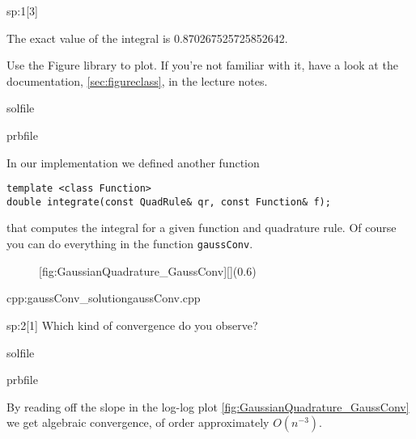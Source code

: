 \begin{samproblem}
\begin{subproblem}{sp:1}[3]
  \begin{samhint}
    The exact value of the integral is 0.870267525725852642.
  \end{samhint}

  \begin{samhint}
    Use the Figure library to plot. If you're not familiar with it,  have a look at the documentation, \cref{sec:figureclass}, in the lecture notes.
  \end{samhint}

  \begin{samwriteprbpart}{solfile}
    \begin{writeverbatim}{prbfile}
      \begin{samsolution}
        In our implementation we defined another function 
        \begin{lstlisting}[style=cpp]
template <class Function>
double integrate(const QuadRule& qr, const Function& f);
        \end{lstlisting}
        that computes the integral for a given function and quadrature rule.
        Of course you can do everything in the function \texttt{gaussConv}.
        \begin{figure}
          \centering
          [fig:GaussianQuadrature_GaussConv][](0.6\textwidth)
        \end{figure}
        \begin{samcode}[C++-code]{cpp:gaussConv_solution}{gaussConv.cpp}
          
        \end{samcode}
      \end{samsolution}
    \end{writeverbatim}
  \end{samwriteprbpart}


\end{subproblem}



\begin{subproblem}{sp:2}[1] 
Which kind of convergence do you observe?

  \begin{samwriteprbpart}{solfile}
    \begin{writeverbatim}{prbfile}
      \begin{samsolution}
        By reading off the slope in the log-log plot \ref{fig:GaussianQuadrature_GaussConv} we get
        algebraic convergence, of order approximately $O(n^{-3})$.
      \end{samsolution}
    \end{writeverbatim}
  \end{samwriteprbpart}
\end{subproblem}


\end{samproblem}
